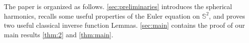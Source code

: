 \documentclass{amsart}
\def\esse{{\mathbb{S}}}
\begin{document}


The paper is organized as follows. \cref{sec:preliminaries} introduces the spherical harmonics, recalls some useful properties of the Euler equation on $\esse^2$, and proves two useful classical inverse function Lemmas.
\cref{sec:main} contains the proof of our main results \cref{thm:2} and \cref{thm:main}.
\end{document}
